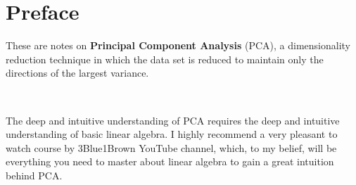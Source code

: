 \documentclass[10pt,twocolumn]{article}
\begin{document}



\vspace{10mm}

\setlength{\parindent}{0cm}

\fontsize{14}{10}\selectfont {Kamila Zdybał}

\vspace{2mm}

\fontsize{8}{10}

\fontsize{8}{10}

\section*{Preface}

These are notes on \textbf{Principal Component Analysis} (PCA), a dimensionality reduction technique in which the data set is reduced to maintain only the directions of the largest variance.

\,\,

The deep and intuitive understanding of PCA requires the deep and intuitive understanding of basic linear algebra. I highly recommend a very pleasant to watch course by 3Blue1Brown YouTube channel, which, to my belief, will be everything you need to master about linear algebra to gain a great intuition behind PCA.
\end{document}
